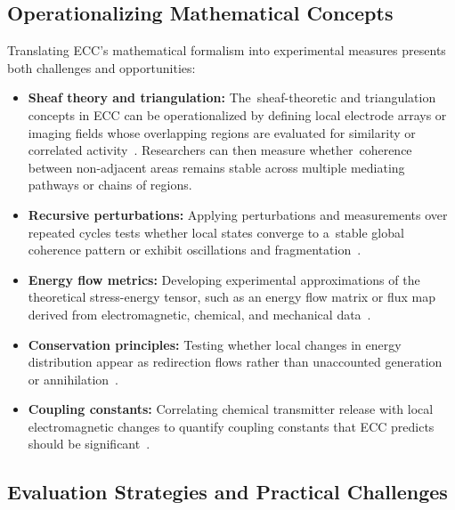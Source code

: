 \subsection*{Operationalizing Mathematical Concepts}

Translating ECC's mathematical formalism into experimental measures presents both challenges and opportunities:

\begin{itemize}
    \item \textbf{Sheaf theory and triangulation:} The~sheaf-theoretic and triangulation concepts in ECC can be operationalized by defining local electrode arrays or imaging fields whose overlapping regions are evaluated for similarity or correlated activity~\cite{abramsky2011sheaf, abramsky2012logical}. Researchers can then measure whether~coherence between non-adjacent areas remains stable across multiple mediating pathways or chains of regions.
    
    \item \textbf{Recursive perturbations:} Applying perturbations and measurements over repeated cycles tests whether local states converge to a~stable global coherence pattern or exhibit oscillations and fragmentation~\cite{da2024mathematical}.
    
    \item \textbf{Energy flow metrics:} Developing experimental approximations of the theoretical stress-energy tensor, such as an energy flow matrix or flux map derived from electromagnetic, chemical, and mechanical data~\cite{freeman2006nonlinear, hales2022electromagnetism}.
    
    \item \textbf{Conservation principles:} Testing whether local changes in energy distribution appear as redirection flows rather than unaccounted generation or annihilation~\cite{bejan2011constructal}.
    
    \item \textbf{Coupling constants:} Correlating chemical transmitter release with local electromagnetic changes to quantify coupling constants that ECC predicts should be significant~\cite{pinotsis2023vivo, anastassiou2015ephaptic}.
\end{itemize}

\subsection*{Evaluation Strategies and Practical Challenges}


